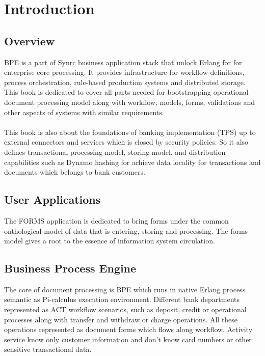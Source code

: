 \section{Introduction}

\subsection{Overview}
BPE is a part of Synrc business application stack that
unlock Erlang for for enterprise core processing.
It provides infrastructure for workflow definitions, process orchestration,
rule-based production systems and distributed storage. This book is dedicated to cover
all parts needed for bootstrapping operational document processing model along with
workflow, models, forms, validations and other aspects of systems with similar requirements.

\paragraph{}
This book is also about the foundations of banking implementation (TPS) up to external
connectors and services which is closed by security policies. So it also defines
transactional processing model, storing model, and distribution capabilities such as
Dynamo hashing for achieve data locality for transactions and documents which
belongs to bank customers.

\subsection{User Applications}
The FORMS application is dedicated to bring forms under the common
onthological model of data that is entering, storing and processing.
The forms model gives a root to the essence of information system circulation.

\subsection{Business Process Engine}
The core of document processing is BPE which runs in native Erlang process semantic
as Pi-calculus execution environment. Different bank departments represented
as ACT workflow scenarios, such as deposit, credit or operational processes along with
transfer and withdraw or charge operations. All these operations represented
as document forms which flows along workflow. Activity service know only
customer information and don't know card numbers or other sensitive transactional data.

